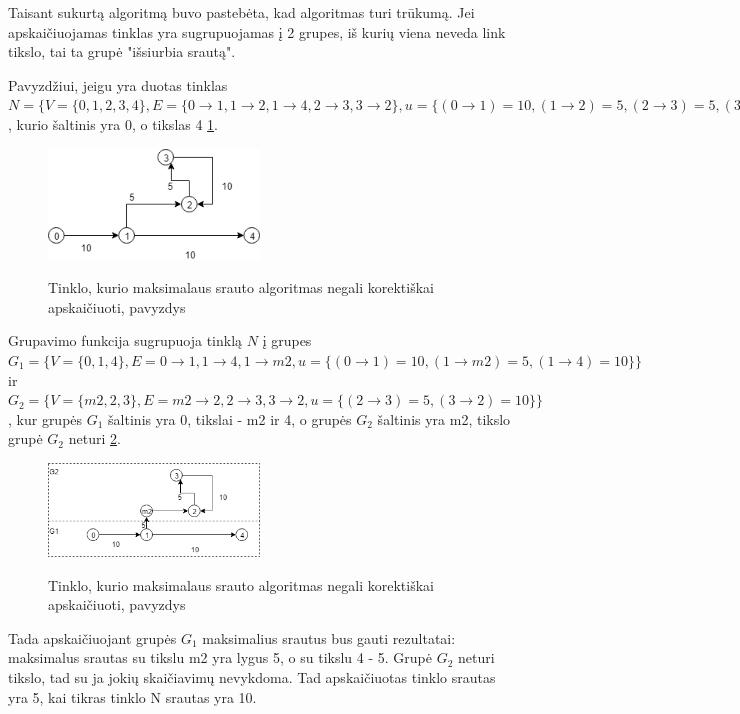 Taisant sukurtą algoritmą buvo pastebėta, kad algoritmas turi trūkumą. Jei apskaičiuojamas tinklas yra sugrupuojamas į 2 grupes, iš kurių viena neveda link tikslo, tai ta grupė "išsiurbia srautą".

Pavyzdžiui, jeigu yra duotas tinklas $N=\{V=\{0, 1, 2, 3, 4\}, E=\{0 \rightarrow 1, 1 \rightarrow 2, 1 \rightarrow 4, 2 \rightarrow 3, 3 \rightarrow 2\}, u=\{(0 \rightarrow 1) = 10, (1 \rightarrow 2) = 5, (2 \rightarrow 3) = 5, (3 \rightarrow 2) = 10, (1 \rightarrow 4) = 10\}\}$, kurio šaltinis yra 0, o tikslas 4  \ref{fig:trukumas}.
\begin{figure}[h]
	\caption{Tinklo, kurio maksimalaus srauto algoritmas negali korektiškai apskaičiuoti, pavyzdys}
	\centering
	\includegraphics[width=0.5\textwidth]{img/trukumas.png}
	\label{fig:trukumas}
\end{figure}

Grupavimo funkcija sugrupuoja tinklą $N$ į grupes $G_1=\{V=\{0, 1, 4\}, E={0 \rightarrow 1, 1 \rightarrow 4, 1 \rightarrow m2}, u=\{(0 \rightarrow 1) = 10, (1 \rightarrow m2) = 5, (1 \rightarrow 4) = 10\}\}$ ir  $G_2=\{V=\{m2, 2, 3\}, E={m2 \rightarrow 2, 2 \rightarrow 3, 3 \rightarrow2}, u=\{(2 \rightarrow 3) = 5, (3 \rightarrow 2) = 10\}\}$, kur grupės $G_1$ šaltinis yra 0,  tikslai - m2 ir 4, o grupės $G_2$ šaltinis yra m2, tikslo grupė $G_2$ neturi  \ref{fig:trukumoGrupes}.
\begin{figure}[h]
	\caption{Tinklo, kurio maksimalaus srauto algoritmas negali korektiškai apskaičiuoti, pavyzdys}
	\centering
	\includegraphics[width=0.5\textwidth]{img/trukumoGrupes.png}
	\label{fig:trukumoGrupes}
\end{figure}

Tada apskaičiuojant grupės $G_1$ maksimalius srautus bus gauti rezultatai: maksimalus srautas su tikslu m2 yra lygus 5, o su tikslu 4 - 5. Grupė $G_2$ neturi tikslo, tad su ja jokių skaičiavimų nevykdoma. Tad apskaičiuotas tinklo srautas yra 5, kai tikras tinklo N srautas yra 10. 